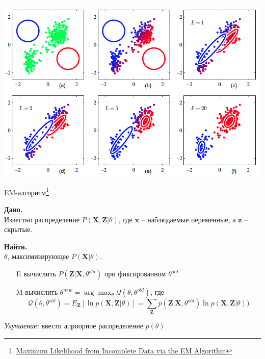 \documentclass[aspectratio=169]{beamer}
\begin{document}
\begin{frame}{}

\begin{center}
\includegraphics[scale=0.35]{images/gauss.png}
\end{center}

\end{frame}

\begin{frame}{EM-алгоритм\footnote{\href{http://web.mit.edu/6.435/www/Dempster77.pdf}{Maximum Likelihood from Incomplete Data via the EM Algorithm}}}

{\bf Дано.} \\ Известно распределение $P(\mathbf{X}, \mathbf{Z} | \theta)$, где $\mathbf{x}$ -- наблюдаемые переменные, а $\mathbf{z}$ -- скрытые. 

{\bf Найти.} \\ $\theta$,  максимизирующее $P(\mathbf{X} | \theta)$.

\vspace{1em}
\begin{itemize}
\item[E] вычислить $P(\mathbf{Z} | \mathbf{X}, \theta^{old})$ при фиксированном $\theta^{old}$
\item[M] вычислить $\theta^{new} = \arg \max_{\theta} \mathcal{Q} (\theta, \theta^{old})$, где
\[
\mathcal{Q} (\theta, \theta^{old}) = E_\mathbf{Z}[\ln p(\mathbf{X}, \mathbf{Z} | \theta)] = \sum_{\mathbf{Z}} p(\mathbf{Z} | \mathbf{X}, \theta^{old}) \ln p(\mathbf{X}, \mathbf{Z} | \theta))
\]
\end{itemize}
{\it Улучшение:} ввести априорное распределение $p(\theta)$

\end{frame}
\end{document}
